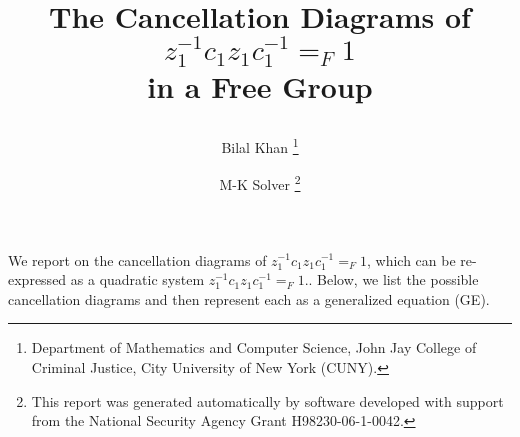 \documentclass[final]{article}
\begin{document}
\date{}
\title{
  {\Large The Cancellation Diagrams of \\$z_{1}^{-1}c_{1}z_{1}c_{1}^{-1}=_F 1$\\ in a Free Group}
  {\normalsize
   \author{Bilal Khan
        \thanks{Department of Mathematics and Computer Science, John Jay College of Criminal Justice, City University of New York (CUNY).}
   \and M-K Solver
        \thanks{This report was generated automatically by software developed with support from the National Security Agency Grant H98230-06-1-0042.}
           }
  }
}

\maketitle

We report on the cancellation diagrams of $z_{1}^{-1}c_{1}z_{1}c_{1}^{-1}=_F 1$,
which can be re-expressed as a quadratic system $z_{1}^{-1}c_{1}z_{1}c_{1}^{-1}=_F 1.$.
Below, we list the possible cancellation diagrams and then represent each as a generalized equation (GE).

\newpage 
\end{document}
